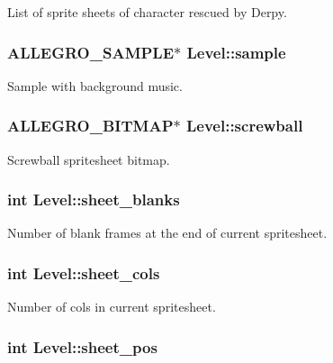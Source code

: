\-List of sprite sheets of character rescued by \-Derpy. \hypertarget{structLevel_a234fa7b9ec35dd360e4e3c48a944fc7d}{
\subsubsection[{sample}]{\setlength{\rightskip}{0pt plus 5cm}\-A\-L\-L\-E\-G\-R\-O\-\_\-\-S\-A\-M\-P\-L\-E$\ast$ {\bf \-Level\-::sample}}}\label{structLevel_a234fa7b9ec35dd360e4e3c48a944fc7d}
\-Sample with background music. \hypertarget{structLevel_a40c90c0712efb86cd76d0dcae74f2cbd}{
\subsubsection[{screwball}]{\setlength{\rightskip}{0pt plus 5cm}\-A\-L\-L\-E\-G\-R\-O\-\_\-\-B\-I\-T\-M\-A\-P$\ast$ {\bf \-Level\-::screwball}}}\label{structLevel_a40c90c0712efb86cd76d0dcae74f2cbd}
\-Screwball spritesheet bitmap. \hypertarget{structLevel_aebaaba311e5d4842fdbd8c50edd40808}{
\subsubsection[{sheet\-\_\-blanks}]{\setlength{\rightskip}{0pt plus 5cm}int {\bf \-Level\-::sheet\-\_\-blanks}}}\label{structLevel_aebaaba311e5d4842fdbd8c50edd40808}
\-Number of blank frames at the end of current spritesheet. \hypertarget{structLevel_a8a5c443169a4ff15f330a65473eedb1b}{
\subsubsection[{sheet\-\_\-cols}]{\setlength{\rightskip}{0pt plus 5cm}int {\bf \-Level\-::sheet\-\_\-cols}}}\label{structLevel_a8a5c443169a4ff15f330a65473eedb1b}
\-Number of cols in current spritesheet. \hypertarget{structLevel_a21c699af201ffe60ccd1319b3f540947}{
\subsubsection[{sheet\-\_\-pos}]{\setlength{\rightskip}{0pt plus 5cm}int {\bf \-Level\-::sheet\-\_\-pos}}}\label{structLevel_a21c699af201ffe60ccd1319b3f540947}
